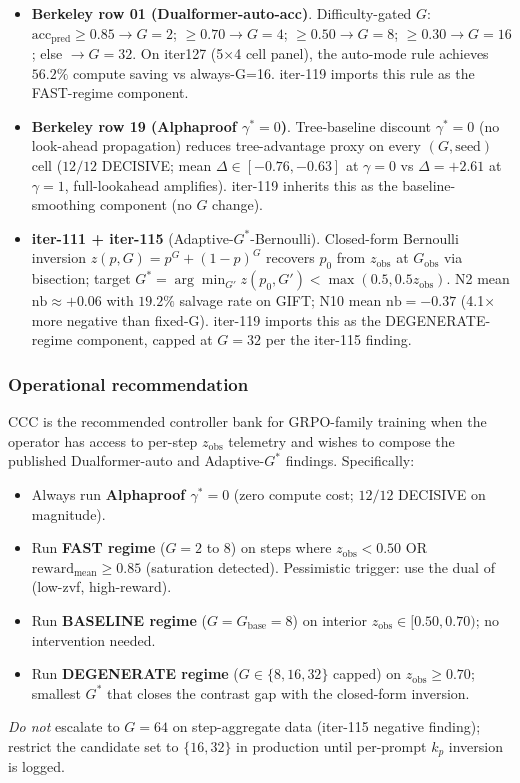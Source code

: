 \documentclass{article}
\begin{document}
\begin{itemize}
\item \textbf{Berkeley row 01 (Dualformer-auto-acc)}.
  Difficulty-gated $G$: $\mathrm{acc}_{\mathrm{pred}}\geq 0.85 \rightarrow G=2$;
  $\geq 0.70 \rightarrow G=4$; $\geq 0.50 \rightarrow G=8$; $\geq 0.30
  \rightarrow G=16$; else $\rightarrow G=32$. On iter127 (5$\times$4 cell
  panel), the auto-mode rule achieves $56.2\%$ compute saving vs
  always-G=16. iter-119 imports this rule as the FAST-regime component.
\item \textbf{Berkeley row 19 (Alphaproof $\gamma^*=0$)}.
  Tree-baseline discount $\gamma^*=0$ (no look-ahead propagation) reduces
  tree-advantage proxy on every $(G, \mathrm{seed})$ cell ($12/12$
  DECISIVE; mean $\Delta \in [-0.76, -0.63]$ at $\gamma=0$ vs
  $\Delta=+2.61$ at $\gamma=1$, full-lookahead amplifies). iter-119
  inherits this as the baseline-smoothing component (no $G$ change).
\item \textbf{iter-111 + iter-115} (Adaptive-$G^*$-Bernoulli).
  Closed-form Bernoulli inversion $z(p,G)=p^G+(1-p)^G$ recovers $p_0$ from
  $z_{\mathrm{obs}}$ at $G_{\mathrm{obs}}$ via bisection; target
  $G^*=\arg\min_{G'} z(p_0,G') < \max(0.5, 0.5 z_{\mathrm{obs}})$. N2
  mean $\mathrm{nb}\approx+0.06$ with $19.2\%$ salvage rate on GIFT;
  N10 mean $\mathrm{nb}=-0.37$ (4.1$\times$ more negative than
  fixed-G). iter-119 imports this as the DEGENERATE-regime component,
  capped at $G=32$ per the iter-115 finding.
\end{itemize}

\subsubsection*{Operational recommendation}

CCC is the recommended controller bank for GRPO-family training when
the operator has access to per-step $z_{\mathrm{obs}}$ telemetry and
wishes to compose the published Dualformer-auto and Adaptive-$G^*$
findings. Specifically:
\begin{itemize}
\item Always run \textbf{Alphaproof $\gamma^*=0$} (zero compute cost;
  $12/12$ DECISIVE on magnitude).
\item Run \textbf{FAST regime} ($G=2$ to $8$) on steps where
  $z_{\mathrm{obs}}<0.50$ OR $\mathrm{reward}_{\mathrm{mean}}\geq 0.85$
  (saturation detected). Pessimistic trigger: use the dual of
  (low-zvf, high-reward).
\item Run \textbf{BASELINE regime} ($G=G_{\mathrm{base}}=8$) on interior
  $z_{\mathrm{obs}}\in[0.50, 0.70)$; no intervention needed.
\item Run \textbf{DEGENERATE regime} ($G\in\{8, 16, 32\}$ capped) on
  $z_{\mathrm{obs}}\geq 0.70$; smallest $G^*$ that closes the contrast
  gap with the closed-form inversion.
\end{itemize}
\textit{Do not} escalate to $G=64$ on step-aggregate data (iter-115
negative finding); restrict the candidate set to $\{16, 32\}$ in
production until per-prompt $k_p$ inversion is logged.
\end{document}
